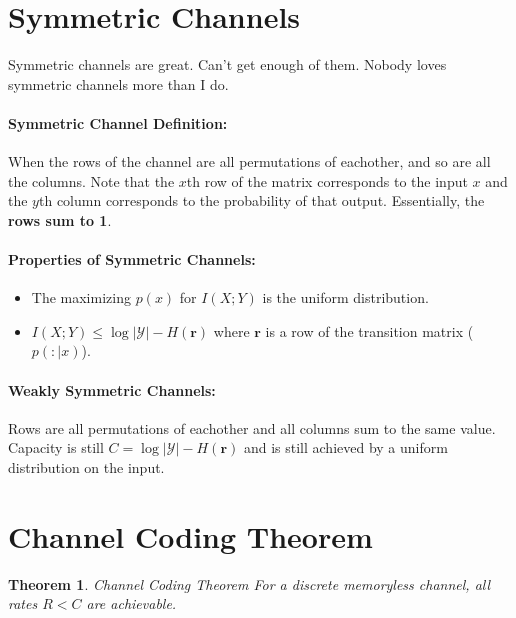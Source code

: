 \documentclass[a4paper,12pt]{report}
\newtheorem{theorem}{Theorem}
\begin{document}
\section{Symmetric Channels}

Symmetric channels are great. Can't get enough of them. Nobody loves symmetric
channels more than I do.

\paragraph{Symmetric Channel Definition: } When the rows of the channel are all
permutations of eachother, and so are all the columns. Note that the $x$th row
of the matrix corresponds to the input $x$ and the $y$th column corresponds to
the probability of that output. Essentially, the \textbf{rows sum to 1}.

\paragraph{Properties of Symmetric Channels: } 
\begin{itemize}
\item The maximizing $p(x)$ for $I(X; Y)$ is the uniform distribution.
\item $I(X; Y) \leq \log |\mathcal Y| - H(\mathbf r)$ where $\mathbf r$ is a row
of the transition matrix ($p(:|x)$). 
\end{itemize}

\paragraph{Weakly Symmetric Channels: } Rows are all permutations of eachother
and all columns sum to the same value. Capacity is still $C = \log |\mathcal Y|
- H(\mathbf r)$ and is still achieved by a uniform distribution on the input.





\section{Channel Coding Theorem}

\begin{theorem}{Channel Coding Theorem}
For a discrete memoryless channel, all rates $R < C$ are achievable.
\end{theorem}
\end{document}
